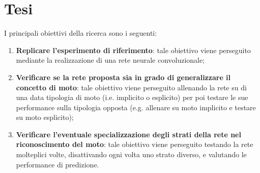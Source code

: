 \section{Tesi}

I principali obiettivi della ricerca sono i seguenti:

\begin{enumerate}
	\item \textbf{Replicare l'esperimento di riferimento}: tale obiettivo viene perseguito mediante la realizzazione di una rete neurale convoluzionale;
	\item \textbf{Verificare se la rete proposta sia in grado di generalizzare il concetto di moto}: tale obiettivo viene perseguito allenando la rete su di una data tipologia di moto (i.e. implicito o esplicito) per poi testare le sue performance sulla tipologia opposta (e.g. allenare su moto implicito e testare su moto esplicito);
	\item \textbf{Verificare l'eventuale specializzazione degli strati della rete nel riconoscimento del moto}: tale obiettivo viene perseguito testando la rete molteplici volte, disattivando ogni volta uno strato diverso, e valutando le performance di predizione. 
\end{enumerate}